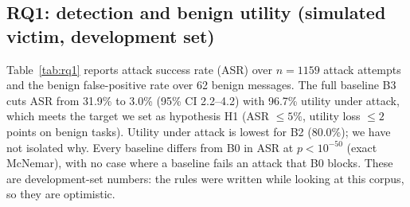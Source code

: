 \documentclass[11pt,a4paper]{article}
\begin{document}
\subsection{RQ1: detection and benign utility (simulated victim, development set)}
Table~\ref{tab:rq1} reports attack success rate (ASR) over $n=1159$ attack attempts and the
benign false-positive rate over 62 benign messages. The full baseline B3 cuts ASR from 31.9\% to
3.0\% (95\% CI 2.2--4.2) with 96.7\% utility under attack, which meets the target we set as hypothesis H1
(ASR $\le 5\%$, utility loss $\le 2$ points on benign tasks). Utility under attack is lowest for B2
(80.0\%); we have not isolated why.
Every baseline differs from B0 in ASR at $p<10^{-50}$ (exact McNemar), with no case where a
baseline fails an attack that B0 blocks. These are development-set numbers: the rules were written
while looking at this corpus, so they are optimistic.
\begin{table}[h]
\centering\small
\caption{RQ1 on the development set with the \emph{simulated} victim. Wilson 95\% intervals.}\label{tab:rq1}

\end{table}
\end{document}
